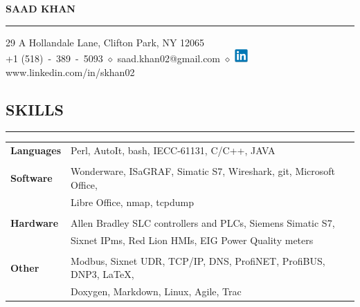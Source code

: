 \documentclass{article}
\begin{document}
%
\begin{center}
    {\MakeUppercase{\huge\bf Saad Khan}} \\
    \bigskip
    \hrule
    \bigskip
    29 A Hollandale Lane, Clifton Park, NY 12065 \\
    +1 (518)~-~389~-~5093
    $\diamond$
    saad.khan02@gmail.com
    $\diamond$
    \href{https://www.linkedin.com/in/skhan02}
         {\includegraphics[width=5mm]{linkedin.png}}
    www.linkedin.com/in/skhan02
    \\
    \bigskip
\end{center}

%
\subsection*{\MakeUppercase{\bf Skills}}
    \hrule
    \bigskip
    \begin{tabular}{l l}
    {\bfseries Languages} &
    Perl, AutoIt, bash, IECC-61131, C/C++, JAVA\\
    \\
    {\bfseries Software} &
    Wonderware, ISaGRAF, Simatic S7, Wireshark, git, Microsoft Office,\\
    &
    Libre Office, nmap, tcpdump \\
    \\
    {\bfseries Hardware} &
    Allen Bradley SLC controllers and PLCs, Siemens Simatic S7,\\
    &
    Sixnet IPms, Red Lion HMIs, EIG Power Quality meters \\
    \\
    {\bfseries Other} &
    Modbus, Sixnet UDR, TCP/IP, DNS, ProfiNET, ProfiBUS, DNP3, \LaTeX, \\
    &
    Doxygen, Markdown, Linux, Agile, Trac \\
    \end{tabular}
    \bigskip

%
\end{document}
